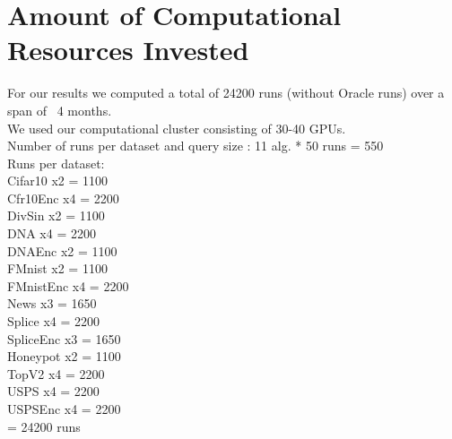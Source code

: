 \documentclass[]{article}
\begin{document}
\section{Amount of Computational Resources Invested}\label{app:compute}
For our results we computed a total of 24200 runs (without Oracle runs) over a span of ~4 months. \\
We used our computational cluster consisting of 30-40 GPUs. \\ [1mm]
Number of runs per dataset and query size : 11 alg. * 50 runs = 550 \\ [1mm]
Runs per dataset: \\
 Cifar10   x2 = 1100\\
 Cfr10Enc  x4 = 2200\\
 DivSin    x2 = 1100\\
 DNA       x4 = 2200\\
 DNAEnc    x2 = 1100\\
 FMnist    x2 = 1100\\
 FMnistEnc x4 = 2200\\
 News      x3 = 1650\\
 Splice    x4 = 2200\\
 SpliceEnc x3 = 1650\\
 Honeypot  x2 = 1100\\
 TopV2     x4 = 2200\\
 USPS      x4 = 2200\\
 USPSEnc   x4 = 2200\\
 = 24200 runs
 
 
\end{document}
